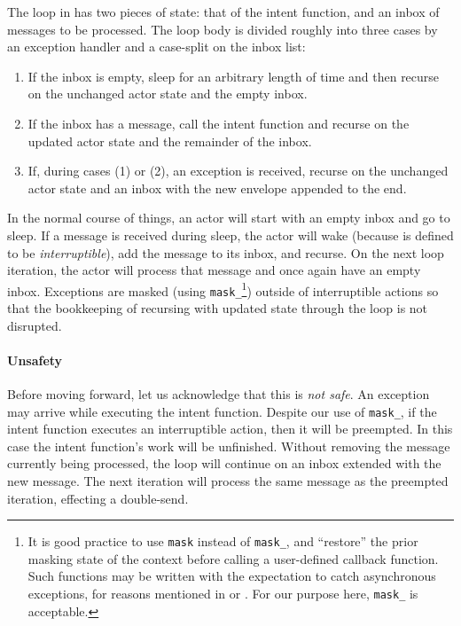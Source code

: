 \documentclass[sigplan,screen]{acmart}
\begin{document}
The loop in  has two pieces of state: that of the intent
function, and an inbox of messages to be processed.
%
The loop body is divided roughly into three cases by an exception
handler and a case-split on the inbox list:
%
\begin{enumerate}[leftmargin=2em]
    \item If the inbox is empty, sleep for an arbitrary length of time and then
    recurse on the unchanged actor state and the empty inbox.
    
    \item If the inbox has a message, call the intent function and recurse on
    the updated actor state and the remainder of the inbox.

    \item If, during cases (1) or (2), an  exception is received,
    recurse on the unchanged actor state and an inbox with the new envelope
    appended to the end.
\end{enumerate}
%
In the normal course of things, an actor will start with an empty inbox and go
to sleep.
%
If a message is received during sleep, the actor will wake (because
 is defined to be \emph{interruptible}), add the message to
its inbox, and recurse.
%
On the next loop iteration, the actor will process that message and once again
have an empty inbox.
%
Exceptions are masked (using \texttt{mask\_}\footnote{
    It is good practice to use \texttt{mask} instead of \texttt{mask\_}, and
    ``restore'' the prior masking state of the context before calling a
    user-defined callback function.
    Such functions may be written with the expectation to catch asynchronous
    exceptions, for reasons mentioned in  or
    \citet{marlow2001async}.
    For our purpose here, \texttt{mask\_} is acceptable.
}) outside of interruptible actions so that the bookkeeping
of recursing with updated state through the loop is not disrupted.


\paragraph{Unsafety}


Before moving forward, let us acknowledge that this is \emph{not safe}.
%
An exception may arrive while executing the intent function.
%
Despite our use of \texttt{mask\_},
if the intent function executes an interruptible action, then
it will be preempted.
%
In this case the intent function's work will be unfinished.
%
Without removing the message currently being processed, the loop
will continue on an inbox extended with the new message.
%
The next iteration will process the same message as the preempted
iteration, effecting a double-send.
\end{document}
